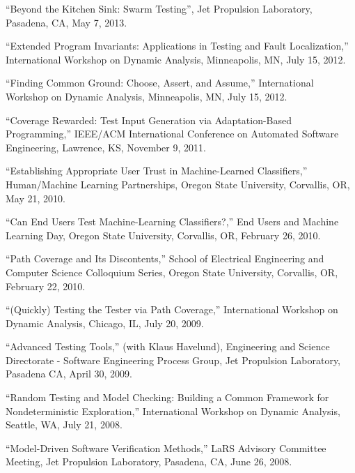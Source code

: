 \documentclass[ComputerScience]{vita}
\begin{document}
\begin{vita}
\begin{Selected Presentations}
\item ``Beyond the Kitchen Sink: Swarm Testing'', Jet Propulsion Laboratory, Pasadena, CA, May 7, 2013.

\item ``Extended Program Invariants: Applications in Testing and Fault Localization,'' International Workshop on Dynamic Analysis, Minneapolis, MN, July 15, 2012.

\item ``Finding Common Ground: Choose, Assert, and Assume,'' International Workshop on Dynamic Analysis, Minneapolis, MN, July 15, 2012.

\item ``Coverage Rewarded: Test Input Generation via Adaptation-Based Programming,'' IEEE/ACM International Conference on Automated Software Engineering, Lawrence, KS, November 9, 2011.

\item ``Establishing Appropriate User Trust in Machine-Learned Classifiers,'' Human/Machine Learning Partnerships, Oregon State University, Corvallis, OR, May 21, 2010.

\item ``Can End Users Test Machine-Learning Classifiers?,'' End Users and Machine Learning Day, Oregon State University, Corvallis, OR, February 26, 2010.

\item ``Path Coverage and Its Discontents,'' School of Electrical Engineering and Computer Science Colloquium Series, Oregon State University, Corvallis, OR, February 22, 2010.

\item ``(Quickly) Testing the Tester via Path Coverage,'' International Workshop on Dynamic Analysis, Chicago, IL, July 20, 2009.

\item ``Advanced Testing Tools,'' (with Klaus Havelund), Engineering and Science Directorate - Software Engineering Process Group, Jet Propulsion Laboratory, Pasadena CA, April 30, 2009.

\item ``Random Testing and Model Checking:   Building a Common Framework for Nondeterministic Exploration,'' International Workshop on Dynamic Analysis, Seattle, WA, July 21, 2008.

\item ``Model-Driven Software Verification Methods,'' LaRS Advisory Committee Meeting, Jet Propulsion Laboratory, Pasadena, CA, June 26, 2008.



\end{Selected Presentations}
\end{vita}
\end{document}
